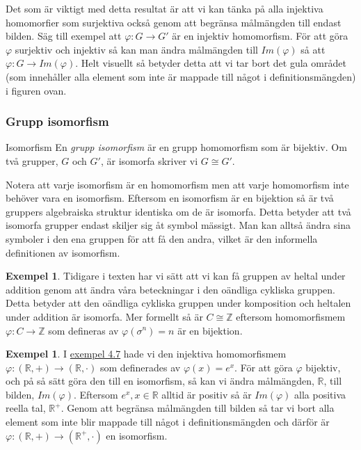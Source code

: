 \documentclass{article}
\theoremstyle{definition}
\newtheorem{exmp}[thm]{Exempel}
\begin{document}
Det som är viktigt med detta resultat är att vi kan tänka på alla injektiva homomorfier som
surjektiva också genom att begränsa målmängden till endast bilden. Säg till exempel att 
$\varphi : G \rightarrow G'$ är en injektiv homomorfism. För att göra $\varphi$ surjektiv och injektiv 
så kan man ändra målmängden till $Im(\varphi)$ så att $\varphi : G \rightarrow Im(\varphi)$.
Helt visuellt så betyder detta att vi tar bort det gula området 
(som innehåller alla element som inte är mappade till något i definitionsmängden) i figuren ovan.


\subsubsection{Grupp isomorfism}
\begin{mydef}{Isomorfism}{}
  En \textit{grupp isomorfism} är en grupp homomorfism som är bijektiv. 
  Om två grupper, $G$ och $G'$, är 
  isomorfa skriver vi $G \cong G'$.
\end{mydef}
Notera att varje isomorfism är en homomorfism men att
varje homomorfism inte behöver vara en isomorfism. 
Eftersom en isomorfism är en bijektion så är två gruppers algebraiska struktur identiska 
om de är isomorfa. Detta betyder att två isomorfa grupper endast skiljer sig åt symbol mässigt. 
Man kan alltså ändra sina symboler i den ena gruppen för att få den andra, vilket är den informella 
definitionen av isomorfism.


\begin{exmp}
Tidigare i texten har vi sätt att vi kan få gruppen av heltal under addition genom att 
ändra våra beteckningar i den oändliga cykliska gruppen. Detta betyder att 
den oändliga cykliska gruppen under komposition och heltalen under addition är isomorfa.
Mer formellt så är $C \cong \mathbb{Z}$ eftersom homomorfismem
$\varphi: C \rightarrow \mathbb{Z}$ 
som defineras av 
$\varphi (\sigma^n) = n$
är en bijektion.
\end{exmp}

\begin{exmp}
  I \hyperlink{exmp4.7}{exempel 4.7} hade vi den injektiva homomorfismem 
  \linebreak
  $\varphi : (\mathbb{R}, +) \rightarrow (\mathbb{R}, \cdot)$ som definerades av 
  $\varphi(x) = e^x.$ För att göra $\varphi$ bijektiv, och på så sätt göra den till en isomorfism, 
  så kan 
  vi ändra målmängden, $\mathbb{R}$, till bilden, $Im(\varphi)$. Eftersom $e^x, x \in \mathbb{R}$
  alltid är positiv så är $Im(\varphi)$ alla positiva reella tal, $\mathbb{R}^+.$
  Genom att begränsa målmängden till bilden så tar vi bort alla element som inte blir 
  mappade till något i definitionsmängden och därför är 
  $\varphi : (\mathbb{R}, +) \rightarrow (\mathbb{R}^+, \cdot)$ en isomorfism. 
\end{exmp}
\end{document}
